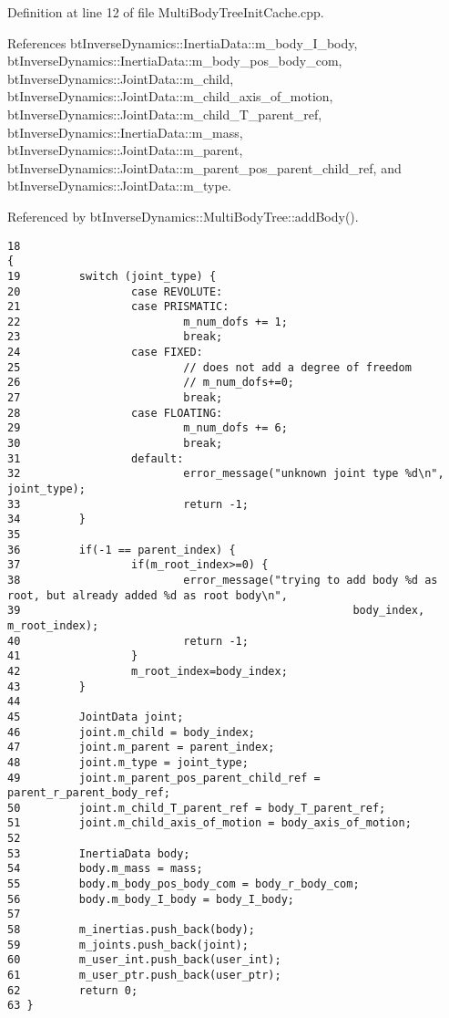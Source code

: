 Definition at line 12 of file MultiBodyTreeInitCache.cpp.

References btInverseDynamics::InertiaData::m\_\-body\_\-I\_\-body, btInverseDynamics::InertiaData::m\_\-body\_\-pos\_\-body\_\-com, btInverseDynamics::JointData::m\_\-child, btInverseDynamics::JointData::m\_\-child\_\-axis\_\-of\_\-motion, btInverseDynamics::JointData::m\_\-child\_\-T\_\-parent\_\-ref, btInverseDynamics::InertiaData::m\_\-mass, btInverseDynamics::JointData::m\_\-parent, btInverseDynamics::JointData::m\_\-parent\_\-pos\_\-parent\_\-child\_\-ref, and btInverseDynamics::JointData::m\_\-type.

Referenced by btInverseDynamics::MultiBodyTree::addBody().

\begin{Code}\begin{verbatim}18                                                                                                               {
19         switch (joint_type) {
20                 case REVOLUTE:
21                 case PRISMATIC:
22                         m_num_dofs += 1;
23                         break;
24                 case FIXED:
25                         // does not add a degree of freedom
26                         // m_num_dofs+=0;
27                         break;
28                 case FLOATING:
29                         m_num_dofs += 6;
30                         break;
31                 default:
32                         error_message("unknown joint type %d\n", joint_type);
33                         return -1;
34         }
35 
36         if(-1 == parent_index) {
37                 if(m_root_index>=0) {
38                         error_message("trying to add body %d as root, but already added %d as root body\n",
39                                                   body_index, m_root_index);
40                         return -1;
41                 }
42                 m_root_index=body_index;
43         }
44 
45         JointData joint;
46         joint.m_child = body_index;
47         joint.m_parent = parent_index;
48         joint.m_type = joint_type;
49         joint.m_parent_pos_parent_child_ref = parent_r_parent_body_ref;
50         joint.m_child_T_parent_ref = body_T_parent_ref;
51         joint.m_child_axis_of_motion = body_axis_of_motion;
52 
53         InertiaData body;
54         body.m_mass = mass;
55         body.m_body_pos_body_com = body_r_body_com;
56         body.m_body_I_body = body_I_body;
57 
58         m_inertias.push_back(body);
59         m_joints.push_back(joint);
60         m_user_int.push_back(user_int);
61         m_user_ptr.push_back(user_ptr);
62         return 0;
63 }
\end{verbatim}
\end{Code}




